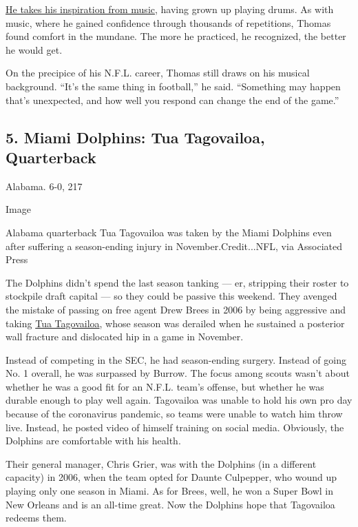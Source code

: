 \href{https://www.nytimes3xbfgragh.onion/article/andrew-thomas.html}{He
takes his inspiration from music}, having grown up playing drums. As
with music, where he gained confidence through thousands of repetitions,
Thomas found comfort in the mundane. The more he practiced, he
recognized, the better he would get.

On the precipice of his N.F.L. career, Thomas still draws on his musical
background. ``It's the same thing in football,'' he said. ``Something
may happen that's unexpected, and how well you respond can change the
end of the game.''

\hypertarget{5-miami-dolphins-tua-tagovailoa-quarterback}{%
\subsection{5. Miami Dolphins: Tua Tagovailoa,
Quarterback}\label{5-miami-dolphins-tua-tagovailoa-quarterback}}

Alabama. 6-0, 217

Image

Alabama quarterback Tua Tagovailoa was taken by the Miami Dolphins even
after suffering a season-ending injury in November.Credit...NFL, via
Associated Press

The Dolphins didn't spend the last season tanking --- er, stripping
their roster to stockpile draft capital --- so they could be passive
this weekend. They avenged the mistake of passing on free agent Drew
Brees in 2006 by being aggressive and taking
\href{https://www.nytimes3xbfgragh.onion/article/tua-tagovailoa.html}{Tua
Tagovailoa}, whose season was derailed when he sustained a posterior
wall fracture and dislocated hip in a game in November.

Instead of competing in the SEC, he had season-ending surgery. Instead
of going No. 1 overall, he was surpassed by Burrow. The focus among
scouts wasn't about whether he was a good fit for an N.F.L. team's
offense, but whether he was durable enough to play well again.
Tagovailoa was unable to hold his own pro day because of the coronavirus
pandemic, so teams were unable to watch him throw live. Instead, he
posted video of himself training on social media. Obviously, the
Dolphins are comfortable with his health.

Their general manager, Chris Grier, was with the Dolphins (in a
different capacity) in 2006, when the team opted for Daunte Culpepper,
who wound up playing only one season in Miami. As for Brees, well, he
won a Super Bowl in New Orleans and is an all-time great. Now the
Dolphins hope that Tagovailoa redeems them.

